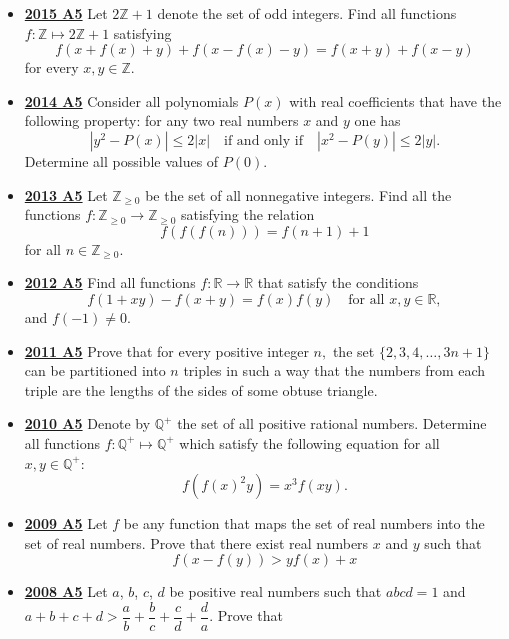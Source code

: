 \documentclass[11pt]{scrartcl}
\begin{document}
\begin{itemize}[leftmargin=*]
\begin{enumerate}[(a)]
\end{enumerate}
\item \href{https://artofproblemsolving.com/community/c6h1268849p6622192}{\textbf{2015 A5}} Let $2\mathbb{Z} + 1$ denote the set of odd integers. Find all functions $f:\mathbb{Z} \mapsto 2\mathbb{Z} + 1$ satisfying\[ f(x + f(x) + y) + f(x - f(x) - y) = f(x+y) + f(x-y) \]for every $x, y \in \mathbb{Z}$. 
\item \href{https://artofproblemsolving.com/community/c6h1113181p5083541}{\textbf{2014 A5}} 	Consider all polynomials $P(x)$ with real coefficients that have the following property: for any two real numbers $x$ and $y$ one has\[|y^2-P(x)|\leqslant 2|x|\quad\text{if and only if}\quad |x^2-P(y)|\leqslant 2|y|.\]Determine all possible values of $P(0)$. 
\item \href{https://artofproblemsolving.com/community/c6h597123p3543371}{\textbf{2013 A5}} Let $\mathbb{Z}_{\geqslant 0}$ be the set of all nonnegative integers. Find all the functions $f: \mathbb{Z}_{\geqslant 0} \rightarrow \mathbb{Z}_{\geqslant 0} $ satisfying the relation
\[ f(f(f(n))) = f(n+1 ) +1 \]
for all $ n\in \mathbb{Z}_{\geqslant 0}$.
\item \href{https://artofproblemsolving.com/community/c6h546165p3160554}{\textbf{2012 A5}} Find all functions $f:\mathbb{R} \rightarrow \mathbb{R}$ that satisfy the conditions
\[f(1+xy)-f(x+y)=f(x)f(y) \quad \text{for all } x,y \in \mathbb{R},\]
and $f(-1) \neq 0$.
\newpage
\item \href{https://artofproblemsolving.com/community/c6h488537p2737645}{\textbf{2011 A5}} Prove that for every positive integer $n,$ the set $\{2,3,4,\dots,3n+1\}$ can be partitioned into $n$ triples in such a way that the numbers from each triple are the lengths of the sides of some obtuse triangle. 
\item \href{https://artofproblemsolving.com/community/c6h418682p2362286}{\textbf{2010 A5}} Denote by $\mathbb{Q}^+$ the set of all positive rational numbers. Determine all functions $f : \mathbb{Q}^+ \mapsto \mathbb{Q}^+$ which satisfy the following equation for all $x, y \in \mathbb{Q}^+:$\[f\left( f(x)^2y \right) = x^3 f(xy).\] 
\item \href{https://artofproblemsolving.com/community/c6h355779p1932913}{\textbf{2009 A5}} Let $f$ be any function that maps the set of real numbers into the set of real numbers. Prove that there exist real numbers $x$ and $y$ such that\[f\left(x-f(y)\right)>yf(x)+x\] 	
\item \href{https://artofproblemsolving.com/community/c6h287855p1555899}{\textbf{2008 A5}} Let $ a$, $ b$, $ c$, $ d$ be positive real numbers such that $ abcd = 1$ and $ a + b + c + d > \dfrac{a}{b} + \dfrac{b}{c} + \dfrac{c}{d} + \dfrac{d}{a}$. Prove that

\end{itemize}
\end{document}
